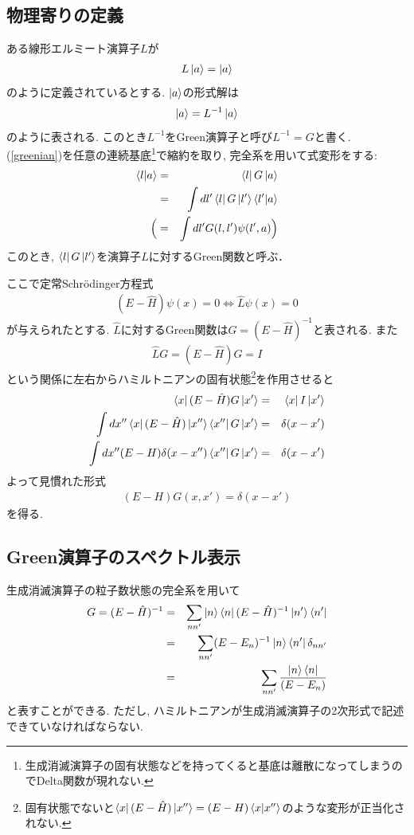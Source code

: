 \documentclass[10.5pt,a4paper]{jreport}
\begin{document}
\subsection{物理寄りの定義}
ある線形エルミート演算子$L$が
\begin{eqnarray}
  L\ket{a} = \ket{a}
\end{eqnarray}
のように定義されているとする. $\ket{a}$の形式解は
\begin{eqnarray}
  \ket{a} = L^{-1}\ket{a}\label{greenian}
\end{eqnarray}
のように表される. このとき$L^{-1}$をGreen演算子と呼び$L^{-1} = G$と書く. (\ref{greenian})を任意の連続基底\footnote{生成消滅演算子の固有状態などを持ってくると基底は離散になってしまうのでDelta関数が現れない.}で縮約を取り, 完全系を用いて式変形をする:
\begin{eqnarray}
  \expval{l|a} &=& \bra{l}G\ket{a}\\
  &=& \int dl' \bra{l}G\ket{l'}\expval{l'|a}\\
  \Bigl(&=& \int dl' G(l,l')\psi(l', a)\Bigr)
\end{eqnarray}
このとき, $\bra{l}G\ket{l'}$を演算子$L$に対するGreen関数と呼ぶ．

ここで定常Schr\"odinger方程式
\begin{eqnarray}
  (E-\hat{H})\psi(x) = 0 \Longleftrightarrow \hat{L}\psi(x) = 0
\end{eqnarray}
が与えられたとする. $\hat{L}$に対するGreen関数は$G = (E-\hat{H})^{-1}$と表される. また
\begin{eqnarray}
  \hat{L}G = (E-\hat{H})G = I
\end{eqnarray}
という関係に左右からハミルトニアンの固有状態\footnote{固有状態でないと$\bra{x}(E-\hat{H})\ket{x''} = (E-H)\expval{x|x''}$のような変形が正当化されない.}を作用させると
\begin{eqnarray}
  \bra{x}(E-\hat{H})G\ket{x'} &=& \bra{x}I\ket{x'}\\
  \int dx''\bra{x}(E-\hat{H})\ket{x''}\bra{x''}G\ket{x'}&=& \delta(x-x')\\
  \int dx''(E-H)\delta(x - x'')\bra{x''}G\ket{x'}&=& \delta(x-x')
\end{eqnarray}
よって見慣れた形式
\begin{eqnarray}
  (E-H)G(x, x') = \delta(x-x')
\end{eqnarray}
を得る.
\subsection{Green演算子のスペクトル表示}
生成消滅演算子の粒子数状態の完全系を用いて
\begin{eqnarray}
  G = (E-\hat{H})^{-1} &=& \sum_{nn'}\ket{n}\bra{n}(E-\hat{H})^{-1}\ket{n'}\bra{n'}\\
  &=& \sum_{nn'}(E-E_n)^{-1}\ket{n}\bra{n'}\delta_{nn'}\\
  &=& \sum_{nn'}\frac{\ket{n}\bra{n}}{(E-E_n)}
\end{eqnarray}
と表すことができる. ただし, ハミルトニアンが生成消滅演算子の2次形式で記述できていなければならない.
\end{document}
